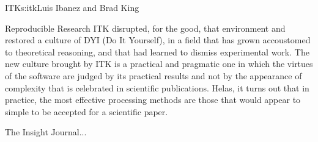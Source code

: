 \begin{aosachapter}{ITK}{s:itk}{Luis Ibanez and Brad King}
\begin{aosasect1}{Reproducible Research}
ITK disrupted, for the good, that environment and restored a culture
of DYI (Do It Yourself), in a field that has grown accoustomed to
theoretical reasoning, and that had learned to dismiss experimental
work. The new culture brought by ITK is a practical and pragmatic one 
in which the virtues of the software are judged by its practical results
and not by the appearance of complexity that is celebrated in scientific
publications. Helas, it turns out that in practice, the most effective 
processing methods are those that would appear to simple to be accepted 
for a scientific paper.

The Insight Journal...
\end{aosasect1}

\end{aosachapter}
